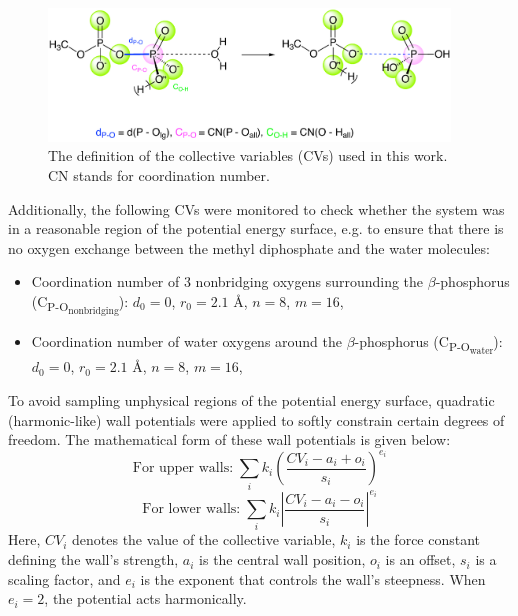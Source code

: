 \begin{figure}[b!]
    \centering
    \includegraphics[width=0.95\textwidth]{Figures/3_Computational_details/methods_collective_variables.pdf}
    \caption{The definition of the collective variables (CVs) used in this work. CN stands for coordination number.}
    \label{fig:collective_variables}
\end{figure}

Additionally, the following CVs were monitored to check whether the system was in a reasonable region of the potential energy surface, e.g. to ensure that there is no oxygen exchange between the methyl diphosphate and the water molecules:
\begin{itemize}
    \item Coordination number of 3 nonbridging oxygens surrounding the $\beta$-phosphorus (C\textsubscript{P-O\textsubscript{nonbridging}}): $d_0 = 0$, $r_0 = 2.1$ \AA, $n = 8$, $m = 16$,
    \item Coordination number of water oxygens around the $\beta$-phosphorus (C\textsubscript{P-O\textsubscript{water}}): $d_0 = 0$, $r_0 = 2.1$ \AA, $n = 8$, $m = 16$,
\end{itemize}

To avoid sampling unphysical regions of the potential energy surface, quadratic (harmonic-like) wall potentials were applied to softly constrain certain degrees of freedom. The mathematical form of these wall potentials is given below:
\begin{equation}
    \text{For upper walls:} \; \sum_i k_i \left( \frac{CV_i - a_i + o_i}{s_i} \right)^{e_i}
    \label{eq:upper_wall}
\end{equation}
\begin{equation}
    \text{For lower walls:} \; \sum_i k_i \left| \frac{CV_i - a_i - o_i}{s_i} \right|^{e_i}
    \label{eq:lower_wall}
\end{equation}
Here, $CV_i$ denotes the value of the collective variable, $k_i$ is the force constant defining the wall's strength, $a_i$ is the central wall position, $o_i$ is an offset, $s_i$ is a scaling factor, and $e_i$ is the exponent that controls the wall’s steepness. When $e_i = 2$, the potential acts harmonically.

